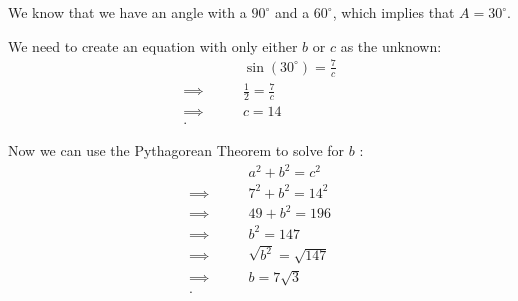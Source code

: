 \begin{solution}
	\label{sol:solving_a_right_triangle}

	We know that we have an angle with a $90^{\circ}$ and a $60^{\circ}$, which
	implies that $A = 30^{\circ}$.

	We need to create an equation with only either $b$ or $c$ as the unknown:
	\begin{align*}
		\qquad         & \sin (30^{\circ}) = \frac{7}{c} \\
		\implies\qquad & \frac{1}{2} = \frac{7}{c}       \\
		\implies\qquad & c = 14                          \\
		.\end{align*}

	Now we can use the Pythagorean Theorem to solve for $b$ :
	\begin{align*}
		\qquad         & a^{2} + b^{2} = c^{2}     \\
		\implies\qquad & 7^{2} + b^{2} = 14^{2}    \\
		\implies\qquad & 49 + b^{2} = 196          \\
		\implies\qquad & b^{2} = 147               \\
		\implies\qquad & \sqrt{b^{2}} = \sqrt{147} \\
		\implies\qquad & b = 7\sqrt{3}             \\
		.\end{align*}

	\begin{figure}[H]
		\centering


		\caption{}
		\label{fig:solving_a_right_triangle_2}
	\end{figure}
\end{solution}

